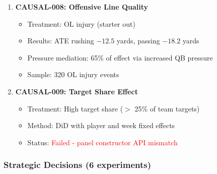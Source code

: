 \begin{enumerate}[resume]
    \item \textbf{CAUSAL-008: Offensive Line Quality} \checkmark
    \begin{itemize}
        \item Treatment: OL injury (starter out)
        \item Results: ATE rushing $-12.5$ yards, passing $-18.2$ yards
        \item Pressure mediation: 65\% of effect via increased QB pressure
        \item Sample: 320 OL injury events
    \end{itemize}

    \item \textbf{CAUSAL-009: Target Share Effect}
    \begin{itemize}
        \item Treatment: High target share ($>$ 25\% of team targets)
        \item Method: DiD with player and week fixed effects
        \item Status: \textcolor{red}{Failed - panel constructor API mismatch}
    \end{itemize}
\end{enumerate}

\subsubsection{Strategic Decisions (6 experiments)}

